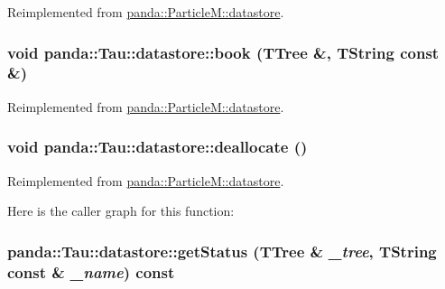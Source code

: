 Reimplemented from \hyperlink{structpanda_1_1ParticleM_1_1datastore_aafc17a88cf8425ff45a00b5fd2eb5751}{panda::ParticleM::datastore}.\hypertarget{structpanda_1_1Tau_1_1datastore_a835217578e10605f669fd448a0e6531c}{
\subsubsection[{book}]{\setlength{\rightskip}{0pt plus 5cm}void panda::Tau::datastore::book (TTree \&, \/  TString const \&)}}
\label{structpanda_1_1Tau_1_1datastore_a835217578e10605f669fd448a0e6531c}


Reimplemented from \hyperlink{structpanda_1_1ParticleM_1_1datastore_ae2eb76ca042d8b3e899c027ee07b5860}{panda::ParticleM::datastore}.\hypertarget{structpanda_1_1Tau_1_1datastore_af651d3ae362a4a6d99b1bff788accca3}{
\subsubsection[{deallocate}]{\setlength{\rightskip}{0pt plus 5cm}void panda::Tau::datastore::deallocate ()}}
\label{structpanda_1_1Tau_1_1datastore_af651d3ae362a4a6d99b1bff788accca3}


Reimplemented from \hyperlink{structpanda_1_1ParticleM_1_1datastore_a85c4ce11f1d7c6944a525ad2488880aa}{panda::ParticleM::datastore}.

Here is the caller graph for this function:\hypertarget{structpanda_1_1Tau_1_1datastore_af6634c2974f07bafef20c5a49dfd4050}{
\subsubsection[{getStatus}]{ panda::Tau::datastore::getStatus (TTree \& {\em \_\-tree}, \/  TString const \& {\em \_\-name}) const}}
\label{structpanda_1_1Tau_1_1datastore_af6634c2974f07bafef20c5a49dfd4050}


